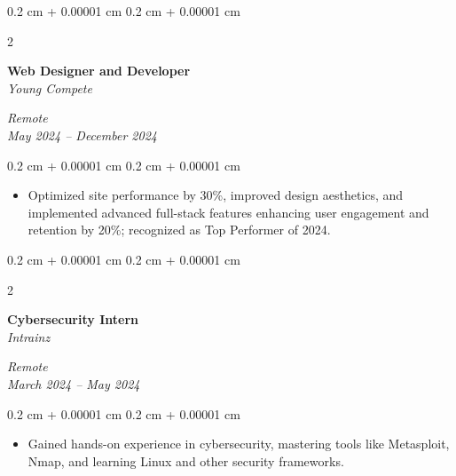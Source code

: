 \documentclass[10pt, letterpaper]{article}
\newenvironment{highlights}{
    \begin{itemize}[
        topsep=0.10 cm,
        parsep=0.10 cm,
        partopsep=0pt,
        itemsep=0pt,
        leftmargin=0.4 cm + 10pt
    ]
}{
    \end{itemize}
} %
\newenvironment{onecolentry}{
    \begin{adjustwidth}{
        0.2 cm + 0.00001 cm
    }{
        0.2 cm + 0.00001 cm
    }
}{
    \end{adjustwidth}
} %
\newenvironment{twocolentry}[2][]{
    \onecolentry
    \def\secondColumn{#2}
    \setcolumnwidth{\fill, 5.0 cm}
    \begin{paracol}{2}
}{
    \switchcolumn \raggedleft \secondColumn
    \end{paracol}
    \endonecolentry
} %
\begin{document}
    \vspace{0.12 cm}
    \begin{twocolentry}{
        \textit{Remote} \\
        \textit{May 2024 – December 2024}
    }
        \textbf{Web Designer and Developer} \\
        \textit{Young Compete}
    \end{twocolentry}
    \vspace{0.10 cm}
    \begin{onecolentry}
        \begin{highlights}
            \item Optimized site performance by 30\%, improved design aesthetics, and implemented advanced full-stack features enhancing user engagement and retention by 20\%; recognized as Top Performer of 2024.
        \end{highlights}
    \end{onecolentry}

    \vspace{0.12 cm}
    \begin{twocolentry}{
        \textit{Remote} \\
        \textit{March 2024 – May 2024}
    }
        \textbf{Cybersecurity Intern} \\
        \textit{Intrainz}
    \end{twocolentry}
    \vspace{0.10 cm}
    \begin{onecolentry}
        \begin{highlights}
            \item Gained hands-on experience in cybersecurity, mastering tools like Metasploit, Nmap, and learning Linux and other security frameworks.
        \end{highlights}
    \end{onecolentry}
\end{document}
